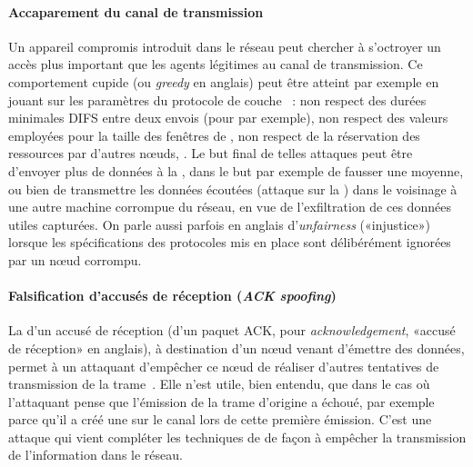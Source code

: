         \paragraph{Accaparement du canal de transmission}
Un appareil compromis introduit dans le réseau peut chercher à s'octroyer un accès plus important que les agents légitimes au canal de transmission.
Ce comportement cupide (ou \textit{greedy} en anglais) peut être atteint par exemple en jouant sur les paramètres du protocole de couche \mac~\cite{PI11}: non respect des durées minimales DIFS entre deux envois (pour \ieeee par exemple), non respect des valeurs employées pour la taille des fenêtres de , non respect de la réservation des ressources par d'autres nœuds, \etc.
Le but final de telles attaques peut être d'envoyer plus de données à la \sdb, dans le but par exemple de fausser une moyenne, ou bien de transmettre les données écoutées (attaque sur la ) dans le voisinage à une autre machine corrompue du réseau, en vue de l'exfiltration de ces données utiles capturées.
On parle aussi parfois en anglais d'\textit{unfairness} («injustice») lorsque les spécifications des protocoles mis en place sont délibérément ignorées par un nœud corrompu.

\paragraph{Falsification d'accusés de réception (\textit{ACK spoofing})}
La  d'un accusé de réception (d'un paquet ACK, pour \textit{acknowledgement}, «accusé de réception» en anglais), à destination d'un nœud venant d'émettre des données, permet à un attaquant d'empêcher ce nœud de réaliser d'autres tentatives de transmission de la trame~\cite{AD14}.
Elle n'est utile, bien entendu, que dans le cas où l'attaquant pense que l'émission de la trame d'origine a échoué, par exemple parce qu'il a créé une  sur le canal lors de cette première émission.
C'est une attaque qui vient compléter les techniques de  de façon à empêcher la transmission de l'information dans le réseau.

